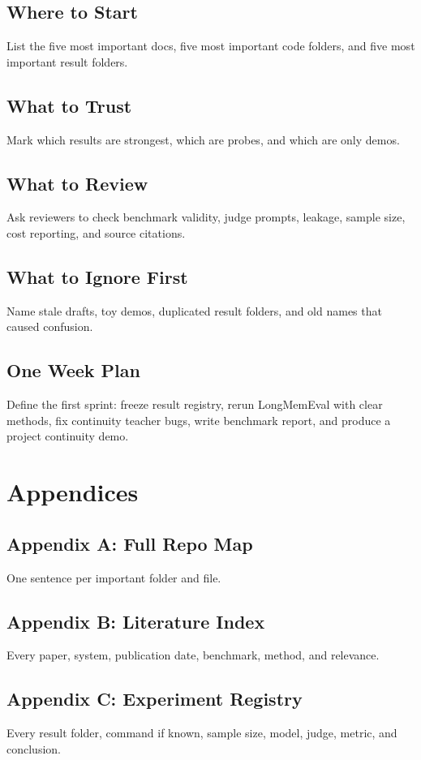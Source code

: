 \documentclass[11pt]{article}
\begin{document}
\subsection{Where to Start}
List the five most important docs, five most important code folders, and five most important result folders.

\subsection{What to Trust}
Mark which results are strongest, which are probes, and which are only demos.

\subsection{What to Review}
Ask reviewers to check benchmark validity, judge prompts, leakage, sample size, cost reporting, and source citations.

\subsection{What to Ignore First}
Name stale drafts, toy demos, duplicated result folders, and old names that caused confusion.

\subsection{One Week Plan}
Define the first sprint: freeze result registry, rerun LongMemEval with clear methods, fix continuity teacher bugs, write benchmark report, and produce a project continuity demo.

\section{Appendices}

\subsection{Appendix A: Full Repo Map}
One sentence per important folder and file.

\subsection{Appendix B: Literature Index}
Every paper, system, publication date, benchmark, method, and relevance.

\subsection{Appendix C: Experiment Registry}
Every result folder, command if known, sample size, model, judge, metric, and conclusion.
\end{document}
